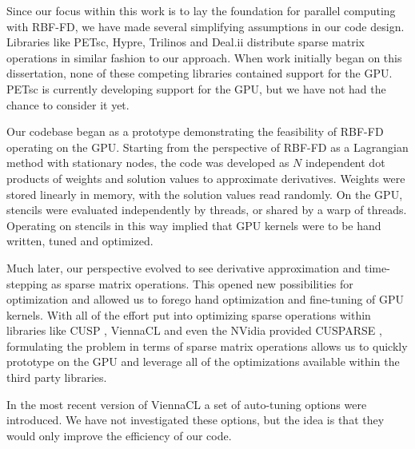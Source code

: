 Since our focus within this work is to lay the foundation for parallel computing
with RBF-FD, we have made several simplifying assumptions in our code design.
Libraries like PETsc, Hypre, Trilinos and Deal.ii distribute sparse matrix
operations in similar fashion to our approach. When work initially began on this
dissertation, none of these competing libraries contained support for the GPU.
PETsc is currently developing support for the GPU, but we have not had the
chance to consider it yet. 

Our codebase began as a prototype demonstrating the feasibility of RBF-FD
operating on the GPU. Starting from the perspective of RBF-FD as a Lagrangian
method with stationary nodes, the code was developed as $N$ independent dot
products of weights and solution values to approximate derivatives. Weights were
stored linearly in memory, with the solution values read randomly. On the GPU,
stencils were evaluated independently by threads, or shared by a warp of
threads. Operating on stencils in this way implied that GPU kernels were to be
hand written, tuned and optimized. 

Much later, our perspective evolved to see derivative approximation and
time-stepping as sparse matrix operations. This opened new possibilities for
optimization and allowed us to forego hand optimization and fine-tuning of GPU
kernels. With all of the effort put into optimizing sparse operations within
libraries like CUSP \cite{Bell2009}, ViennaCL \cite{Rupp2010} and even the
NVidia provided CUSPARSE \cite{CUSPARSE}, formulating the problem in terms of
sparse matrix operations allows us to quickly prototype on the GPU and leverage
all of the optimizations available within the third party libraries. 

In the most recent version of ViennaCL a set of auto-tuning options were
introduced. We have not investigated these options, but the idea is that they
would only improve the efficiency of our code. 


